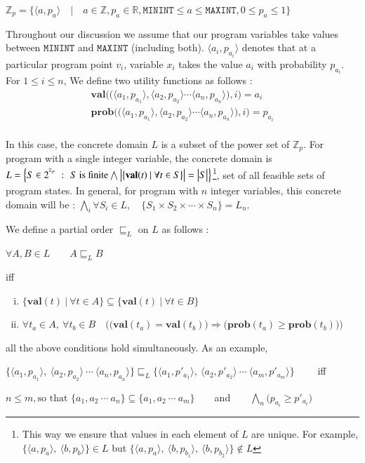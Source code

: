 \documentclass[final,3p, review, times]{util/elsarticle}
\begin{document}
\centerline{
  $\mathbb{Z}_p=\Big\{\langle a,p_a\rangle\quad\big|\quad a\in\mathbb{Z}, p_a\in\mathbb{R}, \mathtt{MININT}\leq a\leq\mathtt{MAXINT}, 0\leq p_a\leq1\Big\}$
}

Throughout our discussion we assume that our program variables take values between $\mathbf{\mathtt{MININT}}$ and $\mathbf{\mathtt{MAXINT}}$ (including both). $\langle a_i,p_{a_i}\rangle$ denotes that at a particular program point $v_i$, variable $x_i$ takes the value $a_i$ with probability $p_{a_i}$. For $1\leq i\leq n$, We define two utility functions as follows :
\begin{align}
  \mathbf{val}\bigg(\Big(\langle a_1,p_{a_1}\rangle,\langle a_2,p_{a_2}\rangle\cdots\langle a_n,p_{a_n}\rangle\Big),i\bigg)=a_i\label{eq:val}\\
  \mathbf{prob}\bigg(\Big(\langle a_1,p_{a_1}\rangle,\langle a_2,p_{a_2}\rangle\cdots\langle a_n,p_{a_n}\rangle\Big),i\bigg)=p_{a_i}\label{eq:prob}\\
\end{align}

In this case, the concrete domain $L$ is a subset of the power set of $\mathbb{Z}_p$. For program with a single integer variable, the concrete domain is $L=\Big\{S\in2^{^{\mathbb{Z}_p}}\ \Large:\ \normalsize S\ \text{is finite}\bigwedge\big|\big\{\mathbf{val}(t)\ |\ \forall t\in S\big\}\big|=\big|S\big|\Big\}$\footnote{This way we ensure that values in each element of $L$ are unique. For example, $\Big\{\langle a,p_a\rangle,\ \langle b,p_b\rangle\Big\}\in L$ but $\Big\{\langle a,p_a\rangle,\ \langle b,p_{b_1}\rangle,\ \langle b,p_{b_2}\rangle\Big\}\notin L$}, set of all feasible sets of program states. In general, for program with $n$ integer variables, this concrete domain will be : $\displaystyle\bigwedge_i \forall S_i\in L,\quad\Big\{S_1\times S_2\times\cdots\times S_n\Big\}=L_n.$

We define a partial order $\sqsubseteq_L$ on $L$ as follows :

\centerline{$\forall A,B\in L\qquad A\sqsubseteq_L B$}
iff
\begin{enumerate}[i)]
\item $\Big\{\mathbf{val}(t)\ \big|\ \forall t\in A\Big\}\subseteq\Big\{\mathbf{val}(t)\ \big|\ \forall t\in B\Big\}$
\item $\forall t_a\in A,\ \forall t_b\in B\quad\bigg(\Big(\mathbf{val}(t_a)=\mathbf{val}(t_b)\Big)\Rightarrow\Big(\mathbf{prob}(t_a)\geq\mathbf{prob}(t_b)\Big)\bigg)$
\end{enumerate}
all the above conditions hold simultaneously. As an example,\\
\centerline{
  $\Big\{\langle a_1,p_{a_1}\rangle,\ \langle a_2,p_{a_2}\rangle\ \cdots\ \langle a_n,p_{a_n}\rangle\Big\}\sqsubseteq_L\Big\{\langle a_1,p'_{a_1}\rangle,\ \langle a_2,p'_{a_2}\rangle\ \cdots\ \langle a_m,p'_{a_m}\rangle\Big\}\qquad$ iff
}
\centerline{
  $n\leq m, \text{so that\ }\big\{a_1,a_2\ \cdots\ a_n\big\}\subseteq\big\{a_1,a_2\ \cdots\ a_m\big\}\qquad$and$\qquad\displaystyle\bigwedge_n \big(p_{a_i}\geq p'_{a_i}\big)$
}
\end{document}
